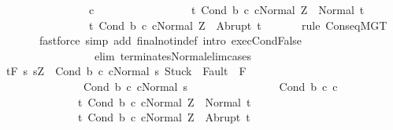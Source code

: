 \begin{isabellebody}
\ \ \ \ \ \ \ \ \ \ \ \ \ \ \ \ c{}\ \isanewline
\ \ \ \ \ \ \ \ \ \ \ \ \ \ \ \ {\isacharbraceleft}t{\isachardot}\ {\isasymGamma}{\isasymturnstile}{\isasymlangle}Cond\ b\ c{}\ c{}{\isacharcomma}Normal\ Z{\isasymrangle}\ {\isasymRightarrow}\ Normal\ t{\isacharbraceright}{\isacharcomma}\isanewline
\ \ \ \ \ \ \ \ \ \ \ \ \ \ \ \ {\isacharbraceleft}t{\isachardot}\ {\isasymGamma}{\isasymturnstile}{\isasymlangle}Cond\ b\ c{}\ c{}{\isacharcomma}Normal\ Z{\isasymrangle}\ {\isasymRightarrow}\ Abrupt\ t{\isacharbraceright}{\isachardoublequoteclose}\ \isanewline
\ \ \ \ \isamarkupfalse%
\ {\isacharparenleft}rule\ ConseqMGT{\isacharparenright}\isanewline
\ \ \ \ \ \ \ {\isacharparenleft}fastforce\ simp\ add{\isacharcolon}\ final{\isacharunderscore}notin{\isacharunderscore}def\ intro{\isacharcolon}\ exec{\isachardot}CondFalse\ \isanewline
\ \ \ \ \ \ \ \ \ \ \ \ \ \ \ \ \ elim{\isacharcolon}\ terminates{\isacharunderscore}Normal{\isacharunderscore}elim{\isacharunderscore}cases{\isacharparenright}\isanewline
\ \ \isamarkupfalse%
\isanewline
\ \ \isamarkupfalse%
\ {\isachardoublequoteopen}{\isasymGamma}{\isacharcomma}{\isasymTheta}{\isasymturnstile}\isactrlsub t\isactrlbsub {\isacharslash}F\isactrlesub \ {\isacharbraceleft}s{\isachardot}\ s{\isacharequal}Z\ {\isasymand}\ {\isasymGamma}{\isasymturnstile}{\isasymlangle}Cond\ b\ c{}\ c{}{\isacharcomma}Normal\ s{\isasymrangle}\ {\isasymRightarrow}{\isasymnotin}{\isacharparenleft}{\isacharbraceleft}Stuck{\isacharbraceright}\ {\isasymunion}\ Fault\ {\isacharbackquote}\ {\isacharparenleft}{\isacharminus}F{\isacharparenright}{\isacharparenright}\ {\isasymand}\ \isanewline
\ \ \ \ \ \ \ \ \ \ \ \ \ \ \ {\isasymGamma}{\isasymturnstile}{\isacharparenleft}Cond\ b\ c{}\ c{}{\isacharparenright}{\isasymdown}Normal\ s{\isacharbraceright}\ \isanewline
\ \ \ \ \ \ \ \ \ \ \ \ \ \ \ {\isacharparenleft}Cond\ b\ c{}\ c{}{\isacharparenright}\isanewline
\ \ \ \ \ \ \ \ \ \ \ \ \ \ {\isacharbraceleft}t{\isachardot}\ {\isasymGamma}{\isasymturnstile}{\isasymlangle}Cond\ b\ c{}\ c{}{\isacharcomma}Normal\ Z{\isasymrangle}\ {\isasymRightarrow}\ Normal\ t{\isacharbraceright}{\isacharcomma}\isanewline
\ \ \ \ \ \ \ \ \ \ \ \ \ \ {\isacharbraceleft}t{\isachardot}\ {\isasymGamma}{\isasymturnstile}{\isasymlangle}Cond\ b\ c{}\ c{}{\isacharcomma}Normal\ Z{\isasymrangle}\ {\isasymRightarrow}\ Abrupt\ t{\isacharbraceright}{\isachardoublequoteclose}\isanewline

\end{isabellebody}
